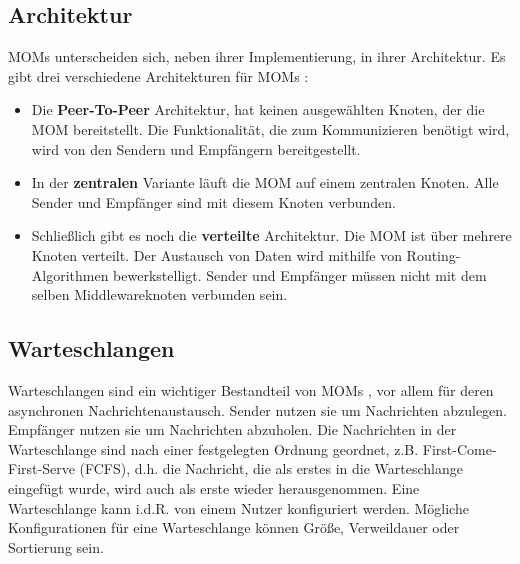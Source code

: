 \subsection{Architektur}
MOMs unterscheiden sich, neben ihrer Implementierung, in ihrer Architektur. Es gibt drei verschiedene Architekturen für MOMs \cite{Rathfelder2013}:
\begin{itemize}
\item Die \textbf{Peer-To-Peer} Architektur, hat keinen ausgewählten Knoten, der die MOM bereitstellt. Die Funktionalität, die zum Kommunizieren benötigt wird, wird von den Sendern und Empfängern bereitgestellt.
\item In der \textbf{zentralen} Variante läuft die MOM auf einem zentralen Knoten. Alle Sender und Empfänger sind mit diesem Knoten verbunden. 
\item Schließlich gibt es noch die \textbf{verteilte} Architektur. Die MOM ist über mehrere Knoten verteilt. Der Austausch von Daten wird mithilfe von Routing-Algorithmen bewerkstelligt. Sender und Empfänger müssen nicht mit dem selben Middlewareknoten verbunden sein.
\end{itemize}  

\subsection{Warteschlangen}
Warteschlangen sind ein wichtiger Bestandteil von MOMs \cite{Curry05}, vor allem für deren asynchronen Nachrichtenaustausch. Sender nutzen sie um Nachrichten abzulegen. Empfänger nutzen sie um Nachrichten abzuholen. Die Nachrichten in der Warteschlange sind nach einer festgelegten Ordnung geordnet, z.B. First-Come-First-Serve (FCFS), d.h. die Nachricht, die als erstes in die Warteschlange eingefügt wurde, wird auch als erste wieder herausgenommen. Eine Warteschlange kann i.d.R. von einem Nutzer konfiguriert werden. Mögliche Konfigurationen für eine Warteschlange können Größe, Verweildauer oder Sortierung sein.

